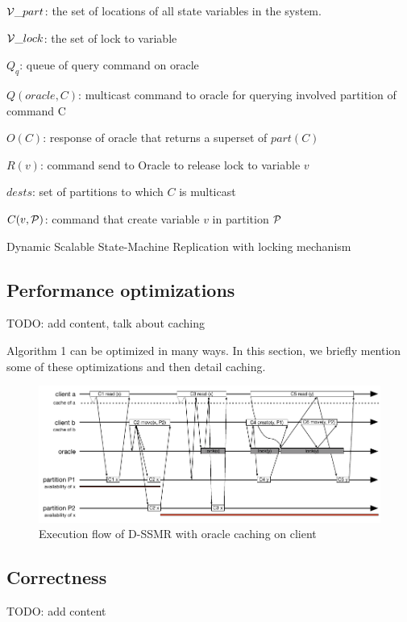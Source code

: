 \begin{algorithm}
\begin{distribalgo}[1]
\vspace{1mm}

$\mathcal{V}\_part$: the set of locations of all state variables in the system.

\vspace{1mm}

$\mathcal{V}\_lock$: the set of lock to variable 

\vspace{1mm}

$Q_q$: queue of query command on oracle

\vspace{1mm}

$Q(oracle, C)$: multicast command to oracle for querying involved partition of command C

\vspace{1mm}

$O(C)$: response of oracle that returns a superset of $part(C)$

\vspace{1mm}

$R(v)$: command send to Oracle to release lock to variable $v$

\vspace{1mm}

$dests$: set of partitions to which $C$ is multicast

\vspace{1mm}

$C(v, \mathcal{P})$: command that create variable $v$ in partition $\mathcal{P}$

\caption{Dynamic Scalable State-Machine Replication with locking mechanism}
\label{alg:dssmr}
\end{distribalgo}
\end{algorithm}

\subsection{Performance optimizations}
\label{sec:optm}
TODO: add content, talk about caching

Algorithm 1 can be optimized in many ways. In this section, we briefly mention some of these optimizations and then detail caching.

\begin{figure}
\begin{minipage}[b]{1\linewidth} %
\centering
      \includegraphics[width=0.85\linewidth]{figures/cache}
\end{minipage}
\caption{Execution flow of D-SSMR with oracle caching on client}
\label{fig:cache}
\end{figure}

\subsection{Correctness}
\label{sec:correctness}
TODO: add content